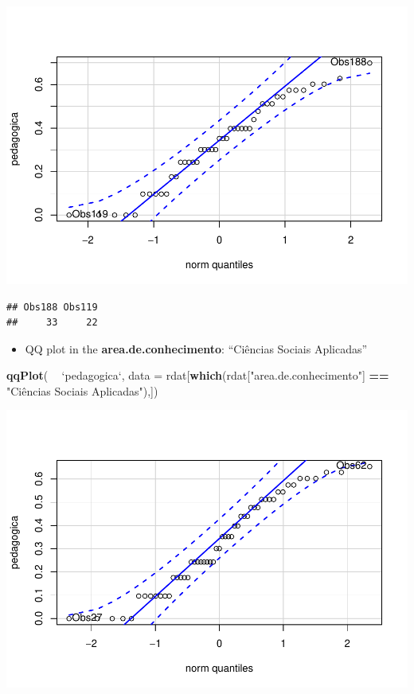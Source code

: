 \documentclass[]{article}
\newenvironment{Shaded}{\begin{snugshade}}{\end{snugshade}}
\newcommand{\DataTypeTok}[1]{\textcolor[rgb]{0.13,0.29,0.53}{#1}}
\newcommand{\KeywordTok}[1]{\textcolor[rgb]{0.13,0.29,0.53}{\textbf{#1}}}
\newcommand{\NormalTok}[1]{#1}
\newcommand{\OperatorTok}[1]{\textcolor[rgb]{0.81,0.36,0.00}{\textbf{#1}}}
\newcommand{\StringTok}[1]{\textcolor[rgb]{0.31,0.60,0.02}{#1}}
\providecommand{\tightlist}{%
  \setlength{\itemsep}{0pt}\setlength{\parskip}{0pt}}
\begin{document}
\includegraphics{factorialAnova_files/figure-latex/unnamed-chunk-16-1.pdf}

\begin{verbatim}
## Obs188 Obs119 
##     33     22
\end{verbatim}

\begin{itemize}
\tightlist
\item
  QQ plot in the \textbf{area.de.conhecimento}: ``Ciências Sociais
  Aplicadas''
\end{itemize}

\begin{Shaded}
\begin{Highlighting}[]
\KeywordTok{qqPlot}\NormalTok{( }\OperatorTok{~}\StringTok{ `}\DataTypeTok{pedagogica}\StringTok{`}\NormalTok{, }\DataTypeTok{data =}\NormalTok{ rdat[}\KeywordTok{which}\NormalTok{(rdat[}\StringTok{"area.de.conhecimento"}\NormalTok{] }\OperatorTok{==}\StringTok{ "Ciências Sociais Aplicadas"}\NormalTok{),])}
\end{Highlighting}
\end{Shaded}

\includegraphics{factorialAnova_files/figure-latex/unnamed-chunk-17-1.pdf}
\end{document}
